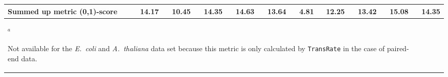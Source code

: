 \documentclass{scrartcl}
\begin{document}
\begin{landscape}
\begin{table}
\begin{scriptsize}
\begin{tabular}{llllllllllll}
\multicolumn{2}{l}{\textbf{Summed up metric (0,1)-score}}&14.17&10.45&14.35&14.63&13.64&4.81&12.25&13.42&15.08&14.35\\\bottomrule
\multicolumn{11}{l}{$^{a}$\begin{scriptsize}Not available for the \emph{E.~coli} and \emph{A.~thaliana} data set because this metric is only calculated by \texttt{TransRate} in the case of paired-end data.\end{scriptsize}}\\\end{tabular}\end{scriptsize}
\end{table}
\end{landscape}
\end{document}
